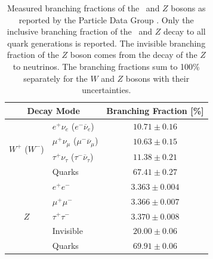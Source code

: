 \begin{table}[ht]
\centering
\begin{tabular}{c|l||c}
\multicolumn{2}{c||}{Decay Mode} &  Branching Fraction [\%]\\
\hline
\hline
\multirow{4}{*}{$W^+$ ($W^-$)}&$e^+\nu_e$ ($e^-\overline{\nu}_e$) & $10.71 \pm 0.16$ \\
&$\mu^+\nu_{\mu}$ ($\mu^-\overline{\nu}_{\mu}$) & $10.63 \pm 0.15$\\
&$\tau^+\nu_{\tau}$ ($\tau^-\overline{\nu}_{\tau}$) & $11.38 \pm 0.21$\\
&Quarks & $67.41 \pm 0.27$\\
\hline
\hline
\multirow{5}{*}{$Z$}&$e^+e^-$ & $3.363 \pm 0.004$ \\
&$\mu^+\mu^-$ & $3.366 \pm 0.007$\\
&$\tau^+\tau^-$ & $3.370 \pm 0.008$\\
&Invisible & $20.00 \pm 0.06$\\
&Quarks & $69.91 \pm 0.06$\\
\end{tabular}
\caption{Measured branching fractions of the \dubya~and $Z$
bosons as reported by the Particle Data Group \cite{PDG:2014}. 
Only the inclusive branching fraction of the \dubya~and $Z$ decay to all quark generations is reported. The invisible branching fraction of the $Z$ boson
comes from the decay of the $Z$ to neutrinos. The branching fractions
sum to 100\% separately for the $W$ and $Z$ bosons with their uncertainties.}
\label{tab:theory_wdecay}
\end{table}




